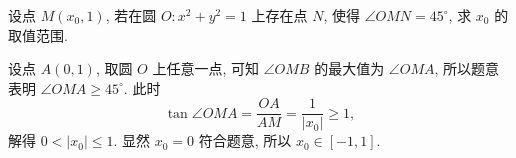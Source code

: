\begin{exercise}
    设点 $M(x_0,1)$, 若在圆 $O\colon x^2 +y^2=1$ 上存在点 $N$, 使得 $\angle OMN=45^\circ$, 求 $x_0$ 的取值范围.
\end{exercise}
\beginsolution
    设点 $A(0,1)$, 取圆 $O$ 上任意一点, 可知 $\angle OMB$ 的最大值为 $\angle OMA$, 所以题意表明 $\angle OMA\geqslant 45^\circ$. 此时
    \[\tan\angle OMA= \frac{OA}{AM}
        = \frac1{|x_0|}\geqslant 1,\]
    解得 $0<|x_0|\leqslant 1$. 显然 $x_0=0$ 符合题意, 所以 $x_0\in[-1,1]$.
\endsolution
